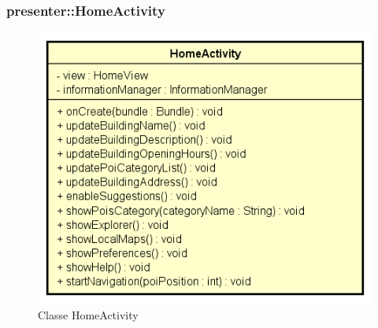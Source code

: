 \documentclass[../DefinizioneDiProdotto.tex]{subfiles}
\begin{document}
\subsubsection{presenter::HomeActivity}

    \begin{figure}[H]
        \centering
        \includegraphics{img/HomeActivity.png}
        \caption{Classe HomeActivity}\label{fig:presenter::HomeActivity} 
    \end{figure}
\end{document}
